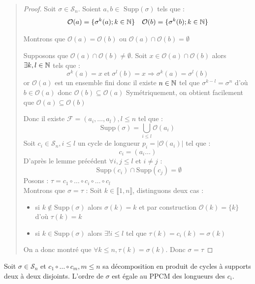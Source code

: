 \begin{quote}
\footnotesize
\begin{proof}
	Soit $\sigma \in \mathcal{S}_n$. Soient $a,b \in \text{ Supp}(\sigma)$ tels que :
		\[ \mathcal{O}(a) = \{\sigma^k(a); k \in \mathbb{N}\} \quad \mathcal{O}(b) = \{\sigma^k(b); k \in \mathbb{N}\} \] 
	\begin{lemma}
		Montrons que $\mathcal{O}(a) = \mathcal{O}(b)$ ou $\mathcal{O}(a) \cap \mathcal{O}(b) = \emptyset $

		Supposons que $\mathcal{O}(a) \cap \mathcal{O}(b) \not = \emptyset $.
		Soit $ x \in \mathcal{O}(a) \cap \mathcal{O}(b)$ alors $\exists k,l \in \mathbb{N}$ tels que :
			\[ \sigma^k(a) = x \; \text{et} \; \sigma^l(b) = x \Longrightarrow \sigma^k(a) =\sigma^l(b) \]
		or $\mathcal{O}(a)$ est un ensemble fini donc il existe $n \in \mathbb{N}$ tel que  $\sigma^{k-l} = \sigma ^n$ 
		d'où $ b \in \mathcal{O}(a)$ donc $\mathcal{O}(b) \subseteq \mathcal{O}(a)$
		Symétriquement, on obtient facilement que $\mathcal{O}(a) \subseteq \mathcal{O}(b)$
	\end{lemma}
	Donc il existe $\mathcal{F} = (a_i, \dots, a_l), l \leq n$ tel que :
		\[ \text{Supp}(\sigma) = \bigcup_{i \leq l} \mathcal{O}(a_i) \] 
	Soit $c_i \in \mathcal{S}_n, i \leq l $ un cycle de longueur $ p_i = | \mathcal{O}(a_i) | $ tel que :
		\[ c_i = (a_i \dots) \] 
	D'après le lemme précédent $\forall i,j \leq l $ et $ i \not = j $ :
		\[ \boxed{ \text{ Supp}(c_i) \cap \text{Supp}(c_j) = \emptyset } \] 
	{Posons :} $\boxed{ \tau = c_1 \circ \dots \circ c_i \circ \dots \circ c_l }$ \\
	{Montrons que $\sigma = \tau$ :} Soit $k \in \llbracket 1, n \rrbracket $, distinguons deux cas :
	\begin{itemize}
		\item si $k \not \in \text{Supp}(\sigma)$ alors $\sigma(k) = k$ et par construction $\mathcal{O}(k) = \{k\}$ d'où $\tau(k) = k$ 
		\item si $k \in \text{Supp}(\sigma)$ alors $ \exists! i \leq l$ tel que $ \tau(k) = c_i(k) = \sigma(k)$
	\end{itemize}
	On a donc montré que $\forall k \leq n, \tau(k) = \sigma(k)$. Donc $\sigma = \tau$ 
\end{proof}
\normalsize
\end{quote}

\begin{prop}
		Soit $ \sigma \in \mathcal{S}_n$ et $c_1 \circ \dots \circ c_m, m \leq n $ sa décomposition en produit de cycles à supports deux à deux disjoints.
		L'ordre de $\sigma$ est égale au PPCM des longueurs des $c_i$.
\end{prop}

